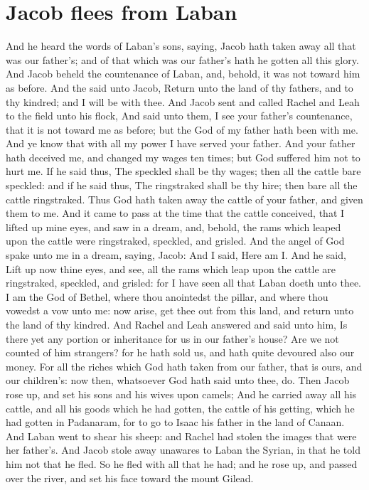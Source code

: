 \section*{Jacob flees from Laban}
\begin{biblechapter} %
\verse And he heard the words of Laban's sons, saying, Jacob hath taken away all that was our father's; and of that which was our father's hath he gotten all this glory.
\verse And Jacob beheld the countenance of Laban, and, behold, it was not toward him as before.
\verse And the \LORD said unto Jacob, Return unto the land of thy fathers, and to thy kindred; and I will be with thee.
\verse And Jacob sent and called Rachel and Leah to the field unto his flock,
\verse And said unto them, I see your father's countenance, that it is not toward me as before; but the God of my father hath been with me.
\verse And ye know that with all my power I have served your father.
\verse And your father hath deceived me, and changed my wages ten times; but God suffered him not to hurt me.
\verse If he said thus, The speckled shall be thy wages; then all the cattle bare speckled: and if he said thus, The ringstraked shall be thy hire; then bare all the cattle ringstraked.
\verse Thus God hath taken away the cattle of your father, and given them to me.
\verse And it came to pass at the time that the cattle conceived, that I lifted up mine eyes, and saw in a dream, and, behold, the rams which leaped upon the cattle were ringstraked, speckled, and grisled.
\verse And the angel of God spake unto me in a dream, saying, Jacob: And I said, Here am I.
\verse And he said, Lift up now thine eyes, and see, all the rams which leap upon the cattle are ringstraked, speckled, and grisled: for I have seen all that Laban doeth unto thee.
\verse I am the God of Bethel, where thou anointedst the pillar, and where thou vowedst a vow unto me: now arise, get thee out from this land, and return unto the land of thy kindred.
\verse And Rachel and Leah answered and said unto him, Is there yet any portion or inheritance for us in our father's house?
\verse Are we not counted of him strangers? for he hath sold us, and hath quite devoured also our money.
\verse For all the riches which God hath taken from our father, that is ours, and our children's: now then, whatsoever God hath said unto thee, do.
\verse Then Jacob rose up, and set his sons and his wives upon camels;
\verse And he carried away all his cattle, and all his goods which he had gotten, the cattle of his getting, which he had gotten in Padanaram, for to go to Isaac his father in the land of Canaan.
\verse And Laban went to shear his sheep: and Rachel had stolen the images that were her father's.
\verse And Jacob stole away unawares to Laban the Syrian, in that he told him not that he fled.
\verse So he fled with all that he had; and he rose up, and passed over the river, and set his face toward the mount Gilead.

\end{biblechapter}
